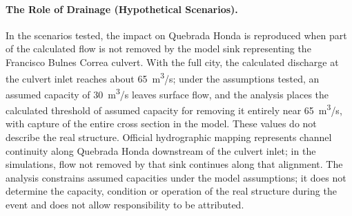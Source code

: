 \paragraph{The Role of Drainage (Hypothetical Scenarios).} In the scenarios tested, the impact on Quebrada Honda is reproduced when part of the calculated flow is not removed by the model sink representing the Francisco Bulnes Correa culvert. With the full city, the calculated discharge at the culvert inlet reaches about \SI{65}{m^3/s}; under the assumptions tested, an assumed capacity of \SI{30}{m^3/s} leaves surface flow, and the analysis places the calculated threshold of assumed capacity for removing it entirely near \SI{65}{m^3/s}, with capture of the entire cross section in the model. These values do not describe the real structure. Official hydrographic mapping represents channel continuity along Quebrada Honda downstream of the culvert inlet; in the simulations, flow not removed by that sink continues along that alignment. The analysis constrains assumed capacities under the model assumptions; it does not determine the capacity, condition or operation of the real structure during the event and does not allow responsibility to be attributed.

